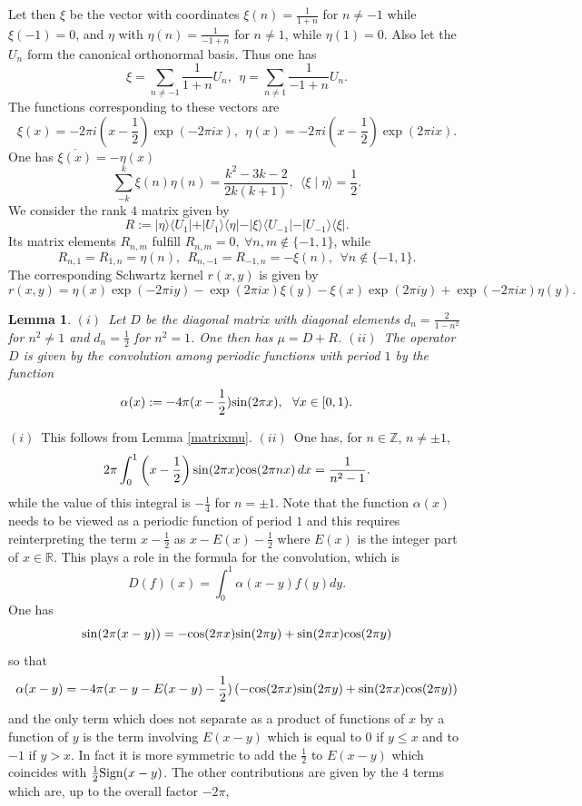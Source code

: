 \documentclass{amsart}
\newtheorem{lem}[thm]{Lemma}
\def\R{{\mathbb R}}
\def\Z{{\mathbb Z}}
\def\sin{{{\rm sin}}}
\def\cos{{{\rm cos}}}
\def\R{{\mathbb R}}
\def\Z{{\mathbb Z}}
\def\sin{{{\rm sin}}}
\def\cos{{{\rm cos}}}
\begin{document}
\medskip
Let then $\xi$ be the vector with coordinates $\xi(n)=\frac{1}{1+n}$ for $n\neq -1$ while  $\xi(-1)=0$, and $\eta$ with $\eta(n)=\frac{1}{-1+n}$ for $n\neq 1$, while $\eta(1)=0$. Also let the $U_n$ form the canonical orthonormal basis. Thus one has
$$
\xi=\sum_{n\neq -1}\frac{1}{1+n} U_n, \ \ \eta=\sum_{n\neq 1}\frac{1}{-1+n} U_n.
$$
The functions corresponding to these vectors are 
$$
\xi(x)=-2 \pi  i \left(x-\frac{1}{2}\right) \exp (-2 \pi  i x), \ \ \eta(x)=-2 \pi  i \left(x-\frac{1}{2}\right) \exp (2 \pi  i x).
$$
One has $\overline{\xi(x)}=-\eta(x)$
$$
\sum_{-k}^k\xi(n)\eta(n)=\frac{k^2-3 k-2}{2 k (k+1)}, \  \ \langle \xi\mid \eta\rangle=\frac 12.
$$
We consider the rank $4$ matrix given by 
$$
R:=\vert \eta\rangle \langle U_{1}\vert +\vert U_{1}\rangle \langle\eta \vert-\vert \xi\rangle \langle U_{-1}\vert -\vert U_{-1}\rangle \langle\xi \vert.
$$
Its matrix elements $R_{n,m}$ fulfill $R_{n,m}=0,\  \forall n,m  \notin \{-1,1\}$, while 
$$
R_{n,1}=R_{1,n}=\eta(n), \ \ R_{n,-1}=R_{-1,n}=-\xi(n), \ \ \forall n\notin \{-1,1\}.
$$
The corresponding Schwartz kernel $r(x,y)$ is given by 
$$
r(x,y)=\eta(x)\exp(-2 \pi i y)-\exp(2 \pi i x)\xi(y)-\xi(x)\exp(2 \pi i y)+\exp(-2 \pi i x)\eta(y).
$$
\begin{lem} $(i)$~Let $D$ be the diagonal matrix with diagonal elements $d_n=\frac{2}{1-n^2}$ for $n^2\neq 1$ and $d_n=\frac 12$ for $n^2=1$. One then has $\mu=D+R$.\newline
$(ii)$~The operator $D$ is given by the convolution among periodic functions with period $1$ by the function $$\alpha(x):=-4 \pi (x-\frac 12) \sin(2 \pi x), \ \ \forall x\in [0,1).$$
\end{lem}
\proof $(i)$~This follows from Lemma \ref{matrixmu}.\newline
$(ii)$~One has, for $n\in \Z$, $n\neq \pm 1$, 
$$
2 \pi  \int_0^1 \left(x-\frac{1}{2}\right) \sin (2 \pi  x) \cos (2 \pi  n x) \, dx=\frac{1}{n^2-1}.
$$
while the value of this integral is $-\frac{1}{4}$ for $n=\pm 1$.
 \endproof
 Note that the function $\alpha(x)$ needs to be viewed as a periodic function of period $1$ and this requires reinterpreting the term $x-\frac 12$ as $x-E(x)-\frac 12$ where $E(x)$ is the integer part of $x\in \R$. This plays a role in the formula for the convolution, which is 
 $$
 D(f)(x)=\int_0^1 \alpha(x-y)f(y)dy.
 $$
 One has $$\sin (2 \pi  (x-y))=-\cos (2 \pi  x) \sin (2 \pi  y)+\sin (2 \pi  x) \cos (2 \pi  y)$$
 so that 
 $$
 \alpha(x-y)=-4 \pi (x-y-E(x-y)-\frac 12)\left(-\cos (2 \pi  x) \sin (2 \pi  y)+\sin (2 \pi  x) \cos (2 \pi  y)\right)
 $$
 and the only term which does not separate as a product of functions of $x$ by a function of $y$ is the term involving $E(x-y)$ which is equal to $0$ if $y\leq x$ and to $-1$ if $y>x$. In fact it is more symmetric to add the $\frac 12$ to $E(x-y)$ which coincides with $\frac 12 {\rm Sign}(x-y)$. The other contributions are given by the $4$ terms which are, up to the overall factor $-2 \pi$, 
\end{document}
